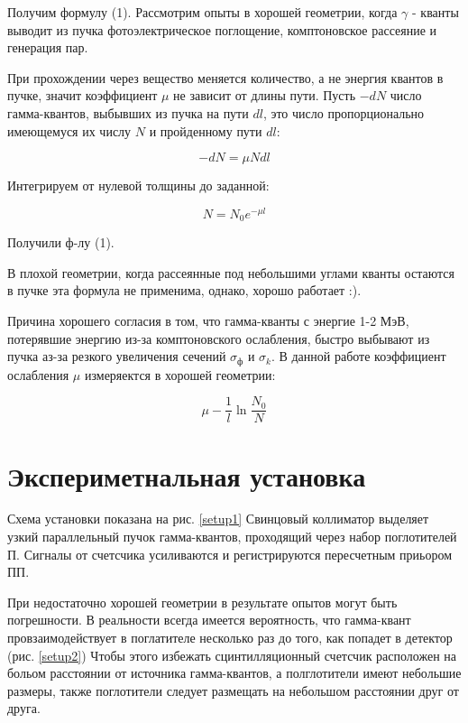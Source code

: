 \documentclass[a4paper]{article}
\begin{document}
Получим формулу (1). Рассмотрим опыты в хорошей геометрии, когда $\gamma$ - кванты выводит из пучка фотоэлектрическое поглощение, комптоновское
рассеяние и генерация пар. \par 

При прохождении через вещество меняется количество, а не энергия квантов в пучке, значит коэффициент 
$\mu$ не зависит от длины пути. Пусть $-dN$ число гамма-квантов, выбывших из пучка на пути $dl$, это число 
пропорционально имеющемуся их числу $N$ и пройденному пути $dl$:

\begin{equation}
    -dN = \mu N dl
\end{equation}

Интегрируем от нулевой толщины до заданной:

\begin{equation}
    N = N_0 e^{-\mu l}
\end{equation}

Получили ф-лу (1).\par 

В плохой геометрии, когда рассеянные под небольшими углами кванты остаются в пучке эта формула не применима, однако,
хорошо работает :). \par
Причина хорошего согласия в том, что гамма-кванты с энергие 1-2 МэВ, потерявшие энергию из-за комптоновского ослабления, 
быстро выбывают из пучка аз-за резкого увеличения сечений $\sigma_ф$ и $\sigma_k$. В данной работе коэффициент ослабления $\mu$
измеряектся в хорошей геометрии:

\begin{equation}
    \mu - \frac{1}{l} \ln{\frac{N_0}{N}}
\end{equation}



\section{Экспериметнальная установка}

Схема установки показана на рис. \ref{setup1}
Свинцовый коллиматор выделяет узкий параллельный пучок гамма-квантов, проходящий через набор поглотителей П.
Сигналы от счетсчика усиливаются и регистрируются пересчетным приьором ПП. \par 

При недостаточно хорошей геометрии в результате опытов могут быть погрешности. В реальности всегда имеется 
вероятность, что гамма-квант провзаимодействует в поглатителе несколько раз до того, как попадет в детектор (рис. \ref{setup2})
Чтобы этого избежать сцинтилляционный счетсчик расположен на больом расстоянии от источника гамма-квантов, а полглотители 
имеют небольшие размеры, также поглотители следует размещать на небольшом расстоянии друг от друга. 
\end{document}
